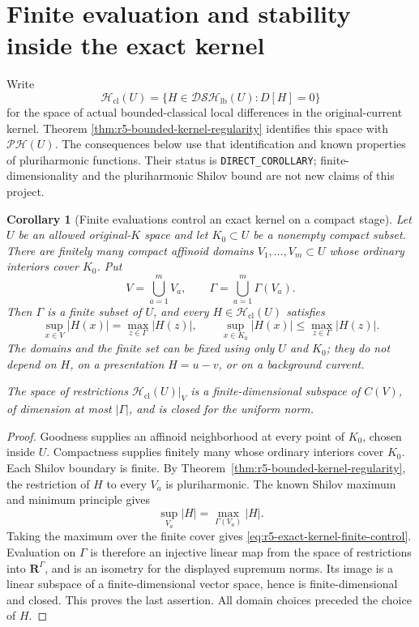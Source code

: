 \documentclass[11pt,a4paper]{article}
\numberwithin{equation}{section}
\newtheorem{corollary}[theorem]{Corollary}
\theoremstyle{definition}
\theoremstyle{remark}
\begin{document}


\section{Finite evaluation and stability inside the exact kernel}
\label{sec:r5-exact-kernel-stability}

Write
\[
 \mathscr H_{\mathrm{cl}}(U)
   =\{H\in\mathscr{DSH}_{\mathrm{lb}}(U):D[H]=0\}
\]
for the space of actual bounded-classical local differences in
the original-current kernel.  Theorem
\ref{thm:r5-bounded-kernel-regularity} identifies this space with
$\mathscr{PH}(U)$.  The consequences below use that identification
and known properties of pluriharmonic functions.  Their status is
\texttt{DIRECT\_COROLLARY}; finite-dimensionality and the
pluriharmonic Shilov bound are not new claims of this project.

\begin{corollary}[Finite evaluations control an exact kernel on a compact stage]
\label{cor:r5-exact-kernel-finite-control}
Let $U$ be an allowed original-$K$ space and let $K_0\subset U$
be a nonempty compact subset.  There are finitely many compact
affinoid domains $V_1,\ldots,V_m\subset U$ whose ordinary
interiors cover $K_0$.  Put
\[
             V=\bigcup_{a=1}^m V_a,
       \qquad \Gamma=\bigcup_{a=1}^m\Gamma(V_a).
\]
Then $\Gamma$ is a finite subset of $U$, and every
$H\in\mathscr H_{\mathrm{cl}}(U)$ satisfies
\begin{equation}
       \sup_{x\in V}|H(x)|=\max_{z\in\Gamma}|H(z)|,
       \qquad
       \sup_{x\in K_0}|H(x)|\leq\max_{z\in\Gamma}|H(z)|.
 \label{eq:r5-exact-kernel-finite-control}
\end{equation}
The domains and the finite set can be fixed using only $U$ and
$K_0$; they do not depend on $H$, on a presentation $H=u-v$,
or on a background current.

The space of restrictions
$\mathscr H_{\mathrm{cl}}(U)|_V$ is a finite-dimensional
subspace of $C(V)$, of dimension at most $|\Gamma|$, and is
closed for the uniform norm.
\end{corollary}

\begin{proof}
Goodness supplies an affinoid neighborhood at every point of
$K_0$, chosen inside $U$.  Compactness supplies finitely many
whose ordinary interiors cover $K_0$.  Each Shilov boundary is
finite.  By Theorem~\ref{thm:r5-bounded-kernel-regularity}, the
restriction of $H$ to every $V_a$ is pluriharmonic.  The known
Shilov maximum and minimum principle
\cite[Proposition 7.3]{GR25} gives
\[
              \sup_{V_a}|H|=\max_{\Gamma(V_a)}|H|.
\]
Taking the maximum over the finite cover gives
\eqref{eq:r5-exact-kernel-finite-control}.  Evaluation on
$\Gamma$ is therefore an injective linear map from the space
of restrictions into $\mathbf R^\Gamma$, and is an isometry
for the displayed supremum norms.  Its image is a linear
subspace of a finite-dimensional vector space, hence is
finite-dimensional and closed.  This proves the last assertion.
All domain choices preceded the choice of $H$.
\end{proof}
\end{document}
